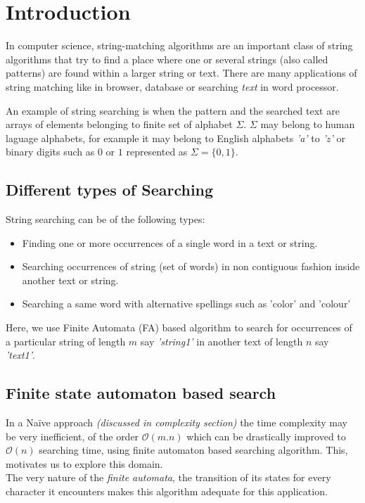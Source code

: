 \documentclass[12pt,a4paper]{article}%
\begin{document}
	\section{Introduction}\label{sec:intro}
	\begin{flushleft}
		\fontsize{12pt}{18pt}\selectfont
		In computer science, string-matching algorithms are an important class of string algorithms that try to find a place where one or several strings (also called patterns) are found within a larger string or text. There are many applications of string matching like in browser, database or searching \textit{text} in word processor. \\\smallskip 
		
		An example of string searching is when the pattern and the searched text are arrays of elements belonging to finite set of alphabet $\Sigma$. $\Sigma$ may belong to human laguage alphabets, for example it may belong to English alphabets \textit{'a'} to \textit{'z'} or binary digits such as $0$ or $1$ represented as $\Sigma = \{0,1\}$.\\\smallskip 
		
		\subsection{Different types of Searching}
		\begin{flushleft} String searching can be of the following types:\\\smallskip
			\begin{itemize}
				\item {Finding one or more occurrences of a single word in a text or string.}
				\item {Searching occurrences of string (set of words) in non contiguous fashion inside another text or string.}
				\item Searching a same word with alternative spellings such as 'color' and 'colour'
			\end{itemize}
		\end{flushleft}
		Here, we use Finite Automata (FA) based algorithm to search for occurrences of a particular string of length $m$ say \textit{'string1'} in another text of length $n$ say \textit{'text1'}. 
		\subsection{Finite state automaton based search}
		\begin{flushleft}
			In a Naïve approach \textit{(discussed in complexity section)} the time complexity may be very inefficient, of the order $\mathcal{O}(m.n)$ which can be drastically improved to $\mathcal{O}(n)$  searching time,  using finite automaton based searching algorithm. This, motivates us to explore this domain.\\\smallskip
			The very nature of the \textit{finite automata}, the transition of its states for every character it encounters makes this algorithm adequate for this application.
		\end{flushleft}
	\end{flushleft}
	\pagebreak
\end{document}
